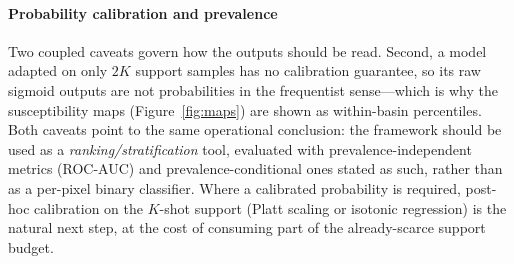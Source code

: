 \paragraph{Probability calibration and prevalence} Two coupled caveats govern how the outputs should be read.  Second, a model adapted on only $2K$ support samples has no calibration guarantee, so its raw sigmoid outputs are not probabilities in the frequentist sense---which is why the susceptibility maps (Figure~\ref{fig:maps}) are shown as within-basin percentiles. Both caveats point to the same operational conclusion: the framework should be used as a \emph{ranking/stratification} tool, evaluated with prevalence-independent metrics (ROC-AUC) and prevalence-conditional ones stated as such, rather than as a per-pixel binary classifier. Where a calibrated probability is required, post-hoc calibration on the $K$-shot support (Platt scaling or isotonic regression) is the natural next step, at the cost of consuming part of the already-scarce support budget.


